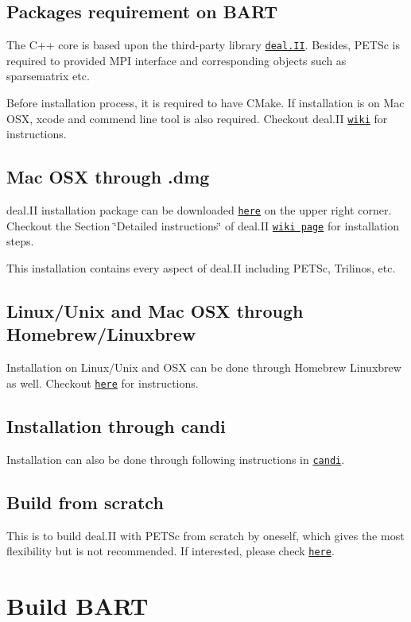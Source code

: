 \subsection*{Packages requirement on B\+A\+RT}

The C++ core is based upon the third-\/party library \href{http://www.dealii.org/}{\tt deal.\+II}. Besides, P\+E\+T\+Sc is required to provided M\+PI interface and corresponding objects such as sparsematrix etc.

Before installation process, it is required to have C\+Make. If installation is on Mac O\+SX, xcode and commend line tool is also required. Checkout deal.\+II \href{https://github.com/dealii/dealii/wiki/MacOSX}{\tt wiki} for instructions.

\subsection*{Mac O\+SX through .dmg}

deal.\+II installation package can be downloaded \href{https://www.dealii.org/download.html}{\tt here} on the upper right corner. Checkout the Section \char`\"{}\+Detailed instructions\char`\"{} of deal.\+II \href{https://github.com/dealii/dealii/wiki/MacOSX}{\tt wiki page} for installation steps.

This installation contains every aspect of deal.\+II including P\+E\+T\+Sc, Trilinos, etc. \subsection*{Linux/\+Unix and Mac O\+SX through Homebrew/\+Linuxbrew}

Installation on Linux/\+Unix and O\+SX can be done through Homebrew Linuxbrew as well. Checkout \href{https://github.com/dealii/dealii/wiki/deal.II-on-Homebrew---Linuxbrew}{\tt here} for instructions.

\subsection*{Installation through candi}

Installation can also be done through following instructions in \href{https://github.com/koecher/candi}{\tt candi}.

\subsection*{Build from scratch}

This is to build deal.\+II with P\+E\+T\+Sc from scratch by oneself, which gives the most flexibility but is not recommended. If interested, please check \href{https://www.dealii.org/developer/readme.html}{\tt here}. \section*{Build B\+A\+RT}

